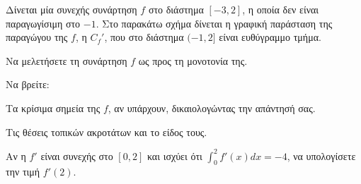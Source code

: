 Δίνεται μία συνεχής συνάρτηση $f$ στο διάστημα $[-3,2]$, η οποία δεν είναι παραγωγίσιμη στο $-1$. Στο παρακάτω σχήμα δίνεται η γραφική παράσταση της παραγώγου της $f$, η $C_f'$, που στο διάστημα $(-1,2]$ είναι ευθύγραμμο τμήμα.
\begin{alist}
    \item Να μελετήσετε τη συνάρτηση $f$ ως προς τη μονοτονία της. 
    \item Να βρείτε:
    \begin{rlist}
        \item Τα κρίσιμα σημεία της $f$, αν υπάρχουν, δικαιολογώντας την απάντησή σας. 
        \item Τις θέσεις τοπικών ακροτάτων και το είδος τους. 
    \end{rlist}
    \item Αν η $f'$ είναι συνεχής στο $[0,2]$ και ισχύει ότι $\int_0^2 f'(x)dx = -4$, να υπολογίσετε την τιμή $f'(2)$. 
\end{alist}